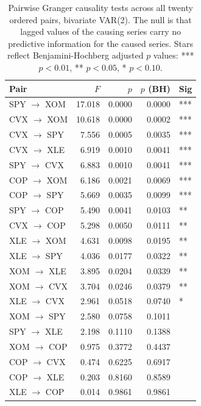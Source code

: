 \begin{table}[htbp]
\centering
\caption{Pairwise Granger causality tests across all twenty ordered pairs, bivariate VAR(2). The null is that lagged values of the causing series carry no predictive information for the caused series. Stars reflect Benjamini-Hochberg adjusted $p$ values: *** $p<0.01$, ** $p<0.05$, * $p<0.10$.} 
\label{tab:granger_full}
\begin{tabular}{lrrrl}
  \toprule
Pair & $F$ & $p$ & $p$ (BH) & Sig \\ 
  \midrule
SPY $\rightarrow$ XOM & 17.018 & 0.0000 & 0.0000 & *** \\ 
  CVX $\rightarrow$ XOM & 10.618 & 0.0000 & 0.0002 & *** \\ 
  CVX $\rightarrow$ SPY & 7.556 & 0.0005 & 0.0035 & *** \\ 
  CVX $\rightarrow$ XLE & 6.919 & 0.0010 & 0.0041 & *** \\ 
  SPY $\rightarrow$ CVX & 6.883 & 0.0010 & 0.0041 & *** \\ 
  COP $\rightarrow$ XOM & 6.186 & 0.0021 & 0.0069 & *** \\ 
  COP $\rightarrow$ SPY & 5.669 & 0.0035 & 0.0099 & *** \\ 
  SPY $\rightarrow$ COP & 5.490 & 0.0041 & 0.0103 & ** \\ 
  CVX $\rightarrow$ COP & 5.298 & 0.0050 & 0.0111 & ** \\ 
  XLE $\rightarrow$ XOM & 4.631 & 0.0098 & 0.0195 & ** \\ 
  XLE $\rightarrow$ SPY & 4.036 & 0.0177 & 0.0322 & ** \\ 
  XOM $\rightarrow$ XLE & 3.895 & 0.0204 & 0.0339 & ** \\ 
  XOM $\rightarrow$ CVX & 3.704 & 0.0246 & 0.0379 & ** \\ 
  XLE $\rightarrow$ CVX & 2.961 & 0.0518 & 0.0740 & * \\ 
  XOM $\rightarrow$ SPY & 2.580 & 0.0758 & 0.1011 &  \\ 
  SPY $\rightarrow$ XLE & 2.198 & 0.1110 & 0.1388 &  \\ 
  XOM $\rightarrow$ COP & 0.975 & 0.3772 & 0.4437 &  \\ 
  COP $\rightarrow$ CVX & 0.474 & 0.6225 & 0.6917 &  \\ 
  COP $\rightarrow$ XLE & 0.203 & 0.8160 & 0.8589 &  \\ 
  XLE $\rightarrow$ COP & 0.014 & 0.9861 & 0.9861 &  \\ 
   \bottomrule
\end{tabular}
\end{table}
